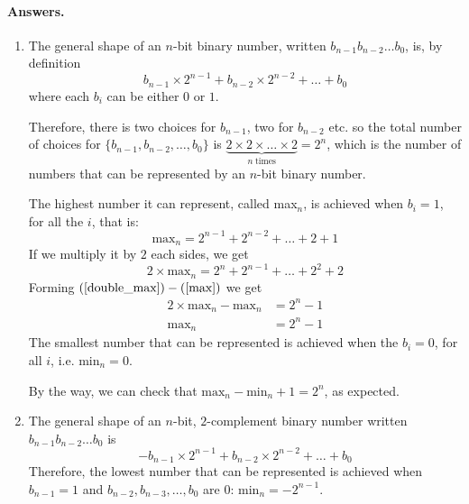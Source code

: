 \paragraph{Answers.}
\begin{enumerate}

  \item The general shape of an \(n\)-bit binary number, written
    \(b_{n-1}b_{n-2}\dots b_{0}\), is, by definition
    \[
    b_{n-1} \times 2^{n-1} + b_{n-2} \times 2^{n-2} + \dots + b_0
    \]
    where each \(b_i\) can be either \(0\) or \(1\).

    Therefore, there is two choices for \(b_{n-1}\), two for
    \(b_{n-2}\) etc. so the total number of choices for \(\{b_{n-1},
    b_{n-2}, \dots, b_0\}\) is \(\underbrace{2 \times 2 \times \dots
      \times 2}_{n \; \text{times}} = 2^n\), which is the number of
    numbers that can be represented by an \(n\)-bit binary number.

    The highest number it can represent, called max\(_n\), is achieved
    when \(b_i = 1\), for all the \(i\), that is:
    \begin{equation}
      \text{max}_{n} = 2^{n-1} + 2^{n-2} + \dots + 2 + 1 \label{max}
    \end{equation}
    If we multiply it by \(2\) each sides, we get 
    \begin{equation}
      2 \times \text{max}_{n} = 2^{n} + 2^{n-1} + \dots + 2^{2} + 2
      \label{double_max}
    \end{equation}
    Forming \((\ref{double_max}) - (\ref{max})\) we get
    \begin{align*}
      2 \times \text{max}_n - \text{max}_n &= 2^{n} - 1\\
      \text{max}_n &= 2^{n} - 1
    \end{align*}
    The smallest number that can be represented is achieved when the
    \(b_i = 0\), for all \(i\), i.e. \(\text{min}_{n} = 0\).

    By the way, we can check that \(\text{max}_n - \text{min}_n + 1 =
    2^n\), as expected.

  \item \label{two_complement} The general shape of an \(n\)-bit,
    \(2\)-complement binary number written \(
    b_{n-1}b_{n-2}\dots{b_0}\) is
    \[
     -b_{n-1} \times 2^{n-1} + b_{n-2} \times 2^{n-2} + \dots + b_0
    \]
    Therefore, the lowest number that can be represented is achieved
    when \(b_{n-1}=1\) and \(b_{n-2}, b_{n-3}, \dots, b_0\) are \(0\):
    \(\text{min}_n=-2^{n-1}\).


\end{enumerate}
